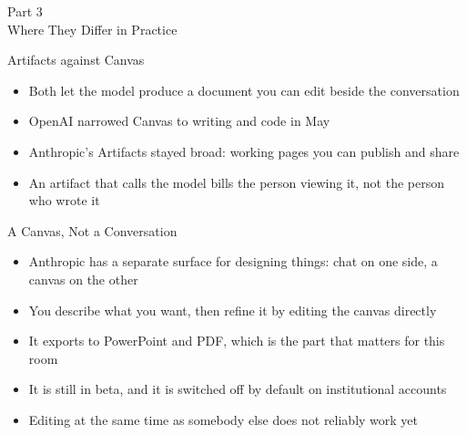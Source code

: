 \documentclass[aspectratio=169]{beamer}
\begin{document}

\begin{frame}[plain]
    \vfill
    \begin{center}
        {\Huge Part 3}\\[0.8em]
        {\Large Where They Differ in Practice}
    \end{center}
    \vfill
\end{frame}

\begin{frame}{Artifacts against Canvas}
    \begin{itemize}
        \item Both let the model produce a document you can edit beside the conversation
        \item OpenAI narrowed Canvas to writing and code in May
        \item Anthropic's Artifacts stayed broad: working pages you can publish and share
        \item An artifact that calls the model bills the person viewing it, not the person
              who wrote it
    \end{itemize}
\end{frame}

\begin{frame}{A Canvas, Not a Conversation}
    \begin{itemize}\setlength{\itemsep}{6pt}
        \item Anthropic has a separate surface for designing things: chat on one side, a
              canvas on the other
        \item You describe what you want, then refine it by editing the canvas directly
        \item It exports to PowerPoint and PDF, which is the part that matters for this room
        \item It is still in beta, and it is switched off by default on institutional
              accounts
        \item Editing at the same time as somebody else does not reliably work yet
    \end{itemize}
\end{frame}
\end{document}
